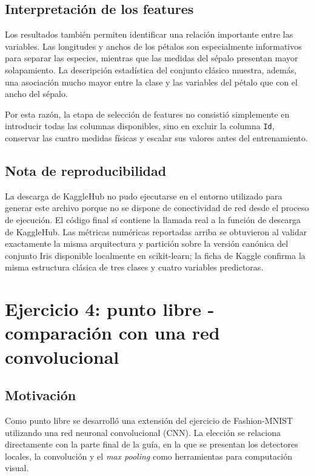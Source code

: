 \documentclass[14pt,twoside]{article}
\begin{document}
\subsection{Interpretación de los features}

Los resultados también permiten identificar una relación importante entre las variables. Las longitudes y anchos de los pétalos son especialmente informativos para separar las especies, mientras que las medidas del sépalo presentan mayor solapamiento. La descripción estadística del conjunto clásico muestra, además, una asociación mucho mayor entre la clase y las variables del pétalo que con el ancho del sépalo. \cite{irisexternal}

Por esta razón, la etapa de selección de features no consistió simplemente en introducir todas las columnas disponibles, sino en excluir la columna \texttt{Id}, conservar las cuatro medidas físicas y escalar sus valores antes del entrenamiento.

\subsection{Nota de reproducibilidad}

La descarga de KaggleHub no pudo ejecutarse en el entorno utilizado para generar este archivo porque no se dispone de conectividad de red desde el proceso de ejecución. El código final sí contiene la llamada real a la función de descarga de KaggleHub. Las métricas numéricas reportadas arriba se obtuvieron al validar exactamente la misma arquitectura y partición sobre la versión canónica del conjunto Iris disponible localmente en scikit-learn; la ficha de Kaggle confirma la misma estructura clásica de tres clases y cuatro variables predictoras. \cite{kaggleiris}

\section{Ejercicio 4: punto libre - comparación con una red convolucional}

\subsection{Motivación}

Como punto libre se desarrolló una extensión del ejercicio de Fashion-MNIST utilizando una red neuronal convolucional (CNN). La elección se relaciona directamente con la parte final de la guía, en la que se presentan los detectores locales, la convolución y el \emph{max pooling} como herramientas para computación visual. \cite{martinez2026}
\end{document}
